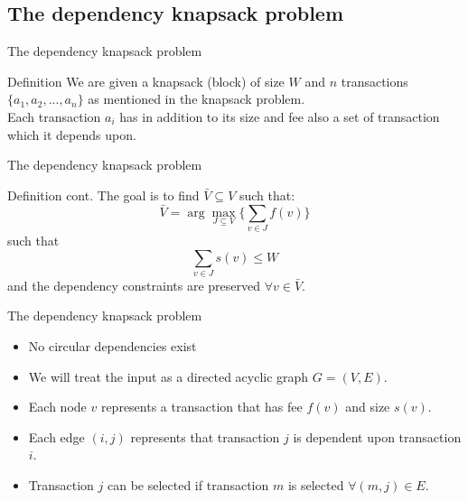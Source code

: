 \documentclass{beamer}
\begin{document}
\subsection*{The dependency knapsack problem}

\begin{frame}{The dependency knapsack problem} %
       \begin{block}{Definition}
    We are given a knapsack (block) of size $W$ and $n$ transactions 
    $ \{a_1,a_2,...,a_n\}$ as mentioned in the knapsack problem. \\ 
    Each transaction $a_i$ has in addition to its size and fee also a
    set of transaction which it depends upon. \\ 
    \end{block}
\end{frame}

\begin {frame}{The dependency knapsack problem} %
    \begin{block}{Definition cont.}
    The goal is to find $\bar V \subseteq V$ such that: \\
    $$ \bar V = \arg \max_{J\subseteq V} \{\sum_{v\in J} f(v)\}$$ such 
    that \\
    $$ \sum_{v \in J} s(v) \leq W $$
    and the dependency constraints are preserved $\forall v \in \bar V$.
    \end{block}
\end{frame}

\begin{frame}{The dependency knapsack problem} %
    \begin{itemize}
        \item  {No circular dependencies exist}
        \item {We will treat the input as a directed acyclic graph 
        $ G = (V,E)$.}
        \item {Each node $v$ represents a transaction that has fee $f(v)$ 
        and size $s(v)$.}
        \item { Each edge $(i,j)$ represents that transaction $j$ is 
        dependent upon transaction $i$.}
        \item {Transaction $j$ can be selected if transaction $m$ is 
        selected $\forall (m,j)\in E$.}
    \end{itemize}
\end{frame}
\end{document}
